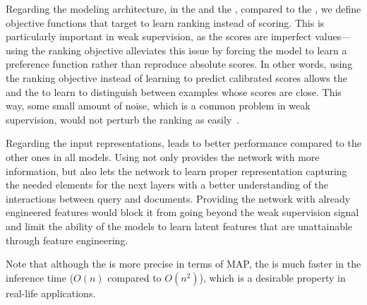 Regarding the modeling architecture, in the \modeltwo and the \modelthree, compared to the \modelone, we define objective functions that target to learn ranking instead of scoring. This is particularly important in weak supervision, as the scores are imperfect values---using the ranking objective alleviates this issue by forcing the model to learn a preference function rather than reproduce absolute scores.
%
In other words, using the ranking objective instead of learning to predict calibrated scores allows the \modeltwo and the \modelthree to learn to distinguish between examples whose scores are close. This way, some small amount of noise, which is a common problem in weak supervision, would not perturb the ranking as easily~\citep{Zamani:2018:ictir}.

Regarding the input representations, \feedthree leads to better performance compared to the other ones in all models.
Using \feedthree not only provides the network with more information, but also lets the network to learn proper representation capturing the needed elements for the next layers with a better understanding of the interactions between query and documents. 
Providing the network with already engineered features would block it from going beyond the weak supervision signal and limit the ability of the models to learn latent features that are unattainable through feature engineering. 

Note that although the \modelthree is more precise in terms of MAP, the \modeltwo is much faster in the inference time ($O(n)$ compared to $O(n^2)$), which is a desirable property in real-life applications.


